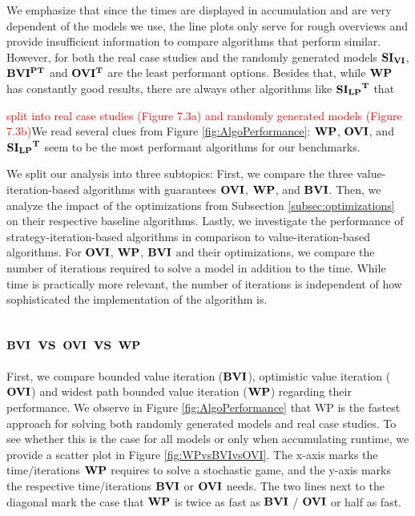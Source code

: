 
We emphasize that since the times are displayed in accumulation and are very dependent of the models we use, 
the line plots only serve for rough overviews and provide insufficient information to compare algorithms that perform similar.
However, for both the real case studies and the randomly generated models $\mathbf{SI_{VI}}$, $\mathbf{BVI^{PT}}$ and $\mathbf{OVI^T}$ are the least performant options.
Besides that, while $\mathbf{WP}$ has constantly good results, there are always other algorithms like $\mathbf{\mathbf{SI_{LP}}^T}$ that 

\textcolor{red}{split into real case studies (Figure 7.3a) and randomly generated models (Figure 7.3b)}We read several clues from Figure \ref{fig:AlgoPerformance}:
$\mathbf{WP}$, $\mathbf{OVI}$, and $\mathbf{\mathbf{SI_{LP}}^T}$ seem to be the most performant algorithms for our benchmarks.

We split our analysis into three subtopics: 
First, we compare the three value-iteration-based algorithms with guarantees $\mathbf{OVI}$, $\mathbf{WP}$, and $\mathbf{BVI}$. 
Then, we analyze the impact of the optimizations from Subsection \ref{subsec:optimizations} on their respective baseline algorithms.
Lastly, we investigate the performance of strategy-iteration-based algorithms in comparison to value-iteration-based algorithms.
For $\mathbf{OVI}$, $\mathbf{WP}$, $\mathbf{BVI}$ and their optimizations, we compare the number of iterations required to solve a model in addition to the time.
While time is practically more relevant, the number of iterations is independent of how sophisticated the implementation of the algorithm is.
\FloatBarrier

\subsection{$\mathbf{BVI}$ vs $\mathbf{OVI}$ vs $\mathbf{WP}$}
First, we compare bounded value iteration ($\mathbf{BVI}$), optimistic value iteration ($\mathbf{OVI}$) and widest path bounded value iteration ($\mathbf{WP}$) regarding their performance.
We observe in Figure \ref{fig:AlgoPerformance} that WP is the fastest approach for solving both randomly generated models and real case studies.
To see whether this is the case for all models or only when accumulating runtime, we provide a scatter plot in Figure \ref{fig:WPvsBVIvsOVI}.
The x-axis marks the time/iterations $\mathbf{WP}$ requires to solve a stochastic game, and the y-axis marks the respective time/iterations $\mathbf{BVI}$ or $\mathbf{OVI}$ needs.
The two lines next to the diagonal mark the case that $\mathbf{WP}$ is twice as fast as $\mathbf{BVI}$ / $\mathbf{OVI}$ or half as fast.

